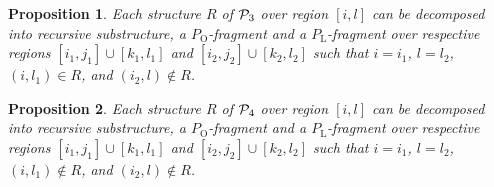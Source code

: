 \documentclass[11pt]{article} %
\newtheorem{proposition}{Proposition}
\newenvironment{proofsketch}{\paragraph{Proof sketch.}}{\hfill$\Box$}
\newcommand{\PLnone}{P_{\text{L}}}
\newcommand{\POnone}{P_{\text{O}}}
\begin{document}
\begin{proposition}
Each structure $R$ of $\P_3$ over region $[i,l]$ can be decomposed into recursive substructure, a $\POnone$-fragment and a $\PLnone$-fragment over respective regions $[i_1,j_1]\cup[k_1,l_1]$ and $[i_2,j_2]\cup[k_2,l_2]$ such that $i=i_1$, $l=l_2$, $(i,l_1)\in R$, and $(i_2,l)\not\in R$. 
\end{proposition}
%

\begin{proposition}
Each structure $R$ of $\P_4$ over region $[i,l]$ can be decomposed into recursive substructure, a $\POnone$-fragment and a $\PLnone$-fragment over respective regions $[i_1,j_1]\cup[k_1,l_1]$ and $[i_2,j_2]\cup[k_2,l_2]$ such that $i=i_1$, $l=l_2$, $(i,l_1)\not\in R$, and $(i_2,l)\not\in R$. 
\end{proposition}
%
\end{document}
